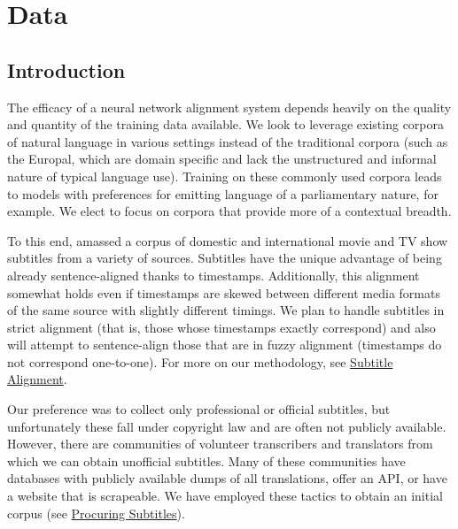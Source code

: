 \documentclass[twoside,twocolumn]{article}
\begin{document}

\section{Data}



\subsection{Introduction}

The efficacy of a neural network alignment system depends heavily on the
quality and quantity of the training data available. We look to leverage
existing corpora of natural language in various settings instead of the
traditional corpora (such as the Europal, which are domain specific and lack
the unstructured and informal nature of typical language use). Training on
these commonly used corpora leads to models with preferences for emitting
language of a parliamentary nature, for example. We elect to focus on corpora
that provide more of a contextual breadth.

To this end, amassed a corpus of domestic and international movie and TV show
subtitles from a variety of sources. Subtitles have the unique advantage of
being already sentence-aligned thanks to timestamps. Additionally, this
alignment somewhat holds even if timestamps are skewed between different media
formats of the same source with slightly different timings. We plan to handle
subtitles in strict alignment (that is, those whose timestamps exactly
correspond) and also will attempt to sentence-align those that are in fuzzy
alignment (timestamps do not correspond one-to-one). For more on our
methodology, see \hyperref[subsec:subtitle-alignment]{Subtitle Alignment}.

Our preference was to collect only professional or official subtitles, but
unfortunately these fall under copyright law and are often not publicly
available. However, there are communities of volunteer transcribers and
translators from which we can obtain unofficial subtitles. Many of these
communities have databases with publicly available dumps of all translations,
offer an API, or have a website that is scrapeable. We have employed these
tactics to obtain an initial corpus (see
\hyperref[subsec:procuring-subtitles]{Procuring Subtitles}).
\end{document}
